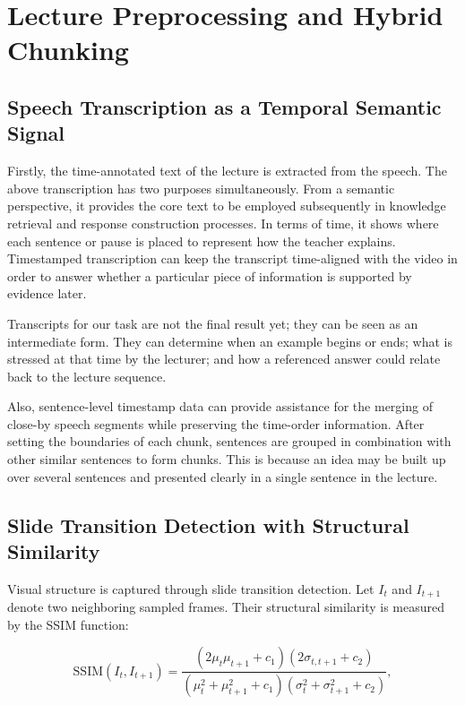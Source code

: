 \section{Lecture Preprocessing and Hybrid Chunking}

\subsection{Speech Transcription as a Temporal Semantic Signal}

Firstly, the time-annotated text of the lecture is extracted from the speech. The above transcription has two purposes simultaneously. From a semantic perspective, it provides the core text to be employed subsequently in knowledge retrieval and response construction processes. In terms of time, it shows where each sentence or pause is placed to represent how the teacher explains. Timestamped transcription can keep the transcript time-aligned with the video in order to answer whether a particular piece of information is supported by evidence later.

Transcripts for our task are not the final result yet; they can be seen as an intermediate form. They can determine when an example begins or ends; what is stressed at that time by the lecturer; and how a referenced answer could relate back to the lecture sequence.

Also, sentence-level timestamp data can provide assistance for the merging of close-by speech segments while preserving the time-order information. After setting the boundaries of each chunk, sentences are grouped in combination with other similar sentences to form chunks. This is because an idea may be built up over several sentences and presented clearly in a single sentence in the lecture.

\subsection{Slide Transition Detection with Structural Similarity}

Visual structure is captured through slide transition detection. Let $I_t$ and $I_{t+1}$ denote two neighboring sampled frames. Their structural similarity is measured by the SSIM function:

\begin{equation}
\mathrm{SSIM}(I_t, I_{t+1}) =
\frac{(2\mu_t\mu_{t+1} + c_1)(2\sigma_{t,t+1} + c_2)}
{(\mu_t^2 + \mu_{t+1}^2 + c_1)(\sigma_t^2 + \sigma_{t+1}^2 + c_2)},
\end{equation}


